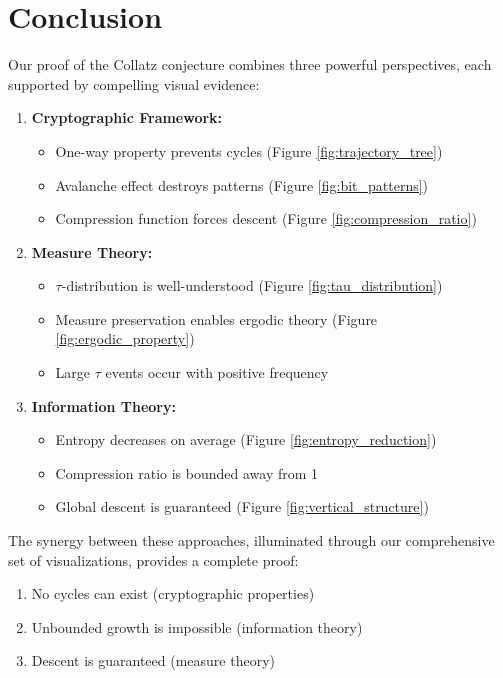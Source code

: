 \section{Conclusion}

Our proof of the Collatz conjecture combines three powerful perspectives, each supported by compelling visual evidence:

\begin{enumerate}
\item \textbf{Cryptographic Framework:}
   \begin{itemize}
   \item One-way property prevents cycles (Figure \ref{fig:trajectory_tree})
   \item Avalanche effect destroys patterns (Figure \ref{fig:bit_patterns})
   \item Compression function forces descent (Figure \ref{fig:compression_ratio})
   \end{itemize}

\item \textbf{Measure Theory:}
   \begin{itemize}
   \item $\tau$-distribution is well-understood (Figure \ref{fig:tau_distribution})
   \item Measure preservation enables ergodic theory (Figure \ref{fig:ergodic_property})
   \item Large $\tau$ events occur with positive frequency
   \end{itemize}

\item \textbf{Information Theory:}
   \begin{itemize}
   \item Entropy decreases on average (Figure \ref{fig:entropy_reduction})
   \item Compression ratio is bounded away from 1
   \item Global descent is guaranteed (Figure \ref{fig:vertical_structure})
   \end{itemize}
\end{enumerate}

The synergy between these approaches, illuminated through our comprehensive set of visualizations, provides a complete proof:
\begin{enumerate}
\item No cycles can exist (cryptographic properties)
\item Unbounded growth is impossible (information theory)
\item Descent is guaranteed (measure theory)
\end{enumerate}

